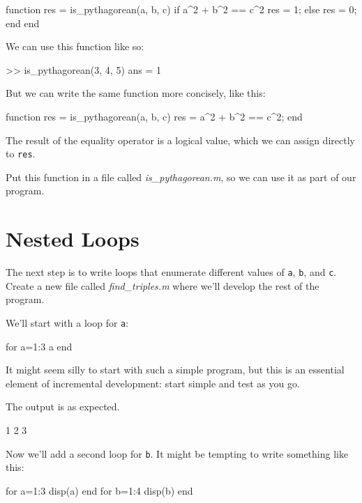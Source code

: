 \begin{code}
function res = is_pythagorean(a, b, c)
    if a^2 + b^2 == c^2
        res = 1;
    else
        res = 0;
    end
end
\end{code}

We can use this function like so:


\begin{code}
>> is_pythagorean(3, 4, 5)
ans = 1
\end{code}

But we can write the same function more concisely, like this:

\begin{code}
function res = is_pythagorean(a, b, c)
    res = a^2 + b^2 == c^2;
end
\end{code}

The result of the equality operator is a logical value, which we can assign directly
to \lstinline{res}.

Put this function in a file called \emph{is\_pythagorean.m}, so we can use it as part of our program.


\section{Nested Loops}

The next step is to write loops that enumerate different values of \lstinline{a}, \lstinline{b}, and
\lstinline{c}.  Create a new file called \emph{find\_triples.m} where we'll develop the rest of the program.


We'll start with a loop for \lstinline{a}:

\begin{code}
for a=1:3
    a
end
\end{code}

It might seem silly to start with such a simple program, but this is an essential element of incremental development: start simple and test as you go.

The output is as expected.

\begin{code}
1
2
3
\end{code}

Now we'll add a second loop for \lstinline{b}.  It might be tempting to write something like this:

\begin{code}
for a=1:3
    disp(a)
end
for b=1:4
    disp(b)
end
\end{code}


